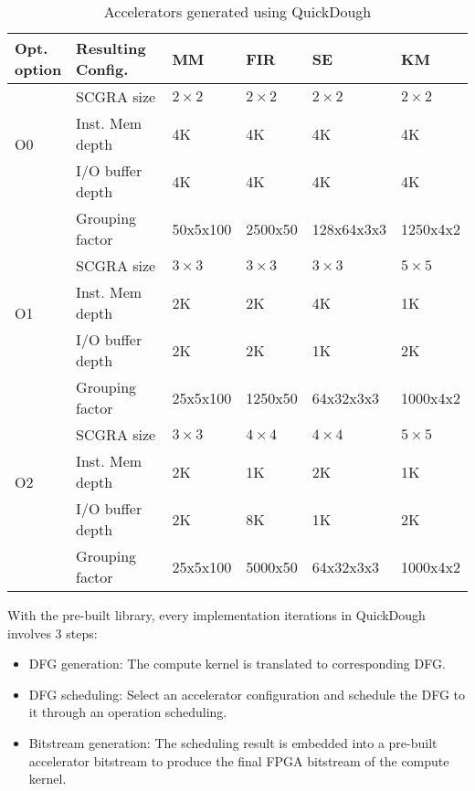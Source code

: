 \begin{table}
\footnotesize
\centering
\caption{Accelerators generated using QuickDough \label{tab:final-acc-config}}{
        \begin{tabular}{l|l|l|l|l|l}
            \hline
            \tabincell{c}{Opt. \\ option} & \tabincell{c}{Resulting \\ Config.} & MM & FIR & SE & KM \\ \hline
            \multirow{3}{*}{O0}  & SCGRA size & $2 \times 2$ & $2 \times 2$ & $2 \times 2$ & $2 \times 2$ \\ \cline{2-6} 
                                & Inst. Mem depth & 4K  & 4K & 4K & 4K \\ \cline{2-6} 
                                & I/O buffer depth & 4K & 4K & 4K & 4K \\ \cline{2-6}
                                & Grouping factor & 50x5x100 & 2500x50 & 128x64x3x3 & 1250x4x2 \\ \hline
            \multirow{3}{*}{O1}  & SCGRA size & $3 \times 3$  & $3 \times 3$  & $3 \times 3$  & $5
            \times 5$  \\ \cline{2-6} 
                                & Inst. Mem depth & 2K & 2K & 4K & 1K \\ \cline{2-6} 
                                & I/O buffer depth & 2K & 2K & 1K & 2K \\ \cline{2-6}
                                & Grouping factor & 25x5x100 & 1250x50 & 64x32x3x3 & 1000x4x2\\ \hline
            \multirow{3}{*}{O2}  & SCGRA size & $3 \times 3$ & $4 \times 4$  & $4 \times 4$  & $5
            \times 5$  \\ \cline{2-6} 
                                & Inst. Mem depth & 2K & 1K & 2K & 1K \\ \cline{2-6} 
                                & I/O buffer depth & 2K & 8K & 1K & 2K \\ \cline{2-6} 
                                & Grouping factor & 25x5x100 & 5000x50 & 64x32x3x3 & 1000x4x2 \\ \hline

        \end{tabular}
    }
\end{table}

With the pre-built library, every implementation iterations in QuickDough involves 3 steps:
\begin{itemize}
\item DFG generation: The compute kernel is translated to corresponding DFG.
\item DFG scheduling: Select an accelerator configuration and schedule the DFG to it through an
    operation scheduling. 
\item Bitstream generation: The scheduling result is embedded into a pre-built accelerator bitstream 
to produce the final FPGA bitstream of the compute kernel.
\end{itemize}

